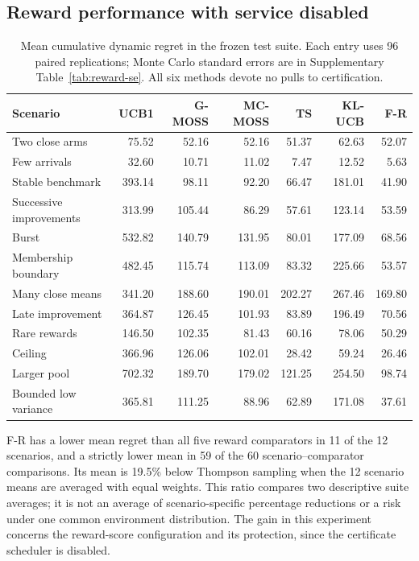 \documentclass[11pt]{article}
\theoremstyle{remark}
\begin{document}
\subsection{Reward performance with service disabled}
\begin{table}[t]
\centering
\caption{Mean cumulative dynamic regret in the frozen test suite. Each entry uses 96 paired replications; Monte Carlo standard errors are in Supplementary Table~\ref{tab:reward-se}. All six methods devote no pulls to certification.}
\label{tab:reward-baselines}
\footnotesize
\begin{tabular}{lrrrrrr}
\toprule
Scenario & UCB1 & G-MOSS & MC-MOSS & TS & KL-UCB & F-R \\
\midrule
Two close arms & 75.52 & 52.16 & 52.16 & 51.37 & 62.63 & 52.07 \\
Few arrivals & 32.60 & 10.71 & 11.02 & 7.47 & 12.52 & 5.63 \\
Stable benchmark & 393.14 & 98.11 & 92.20 & 66.47 & 181.01 & 41.90 \\
Successive improvements & 313.99 & 105.44 & 86.29 & 57.61 & 123.14 & 53.59 \\
Burst & 532.82 & 140.79 & 131.95 & 80.01 & 177.09 & 68.56 \\
Membership boundary & 482.45 & 115.74 & 113.09 & 83.32 & 225.66 & 53.57 \\
Many close means & 341.20 & 188.60 & 190.01 & 202.27 & 267.46 & 169.80 \\
Late improvement & 364.87 & 126.45 & 101.93 & 83.89 & 196.49 & 70.56 \\
Rare rewards & 146.50 & 102.35 & 81.43 & 60.16 & 78.06 & 50.29 \\
Ceiling & 366.96 & 126.06 & 102.01 & 28.42 & 59.24 & 26.46 \\
Larger pool & 702.32 & 189.70 & 179.02 & 121.25 & 254.50 & 98.74 \\
Bounded low variance & 365.81 & 111.25 & 88.96 & 62.89 & 171.08 & 37.61 \\
\bottomrule
\end{tabular}
\end{table}

F-R has a lower mean regret than all five reward comparators in 11 of the 12 scenarios, and a strictly lower mean in 59 of the 60 scenario--comparator comparisons. Its mean is 19.5\% below Thompson sampling when the 12 scenario means are averaged with equal weights. This ratio compares two descriptive suite averages; it is not an average of scenario-specific percentage reductions or a risk under one common environment distribution. The gain in this experiment concerns the reward-score configuration and its protection, since the certificate scheduler is disabled.
\end{document}
